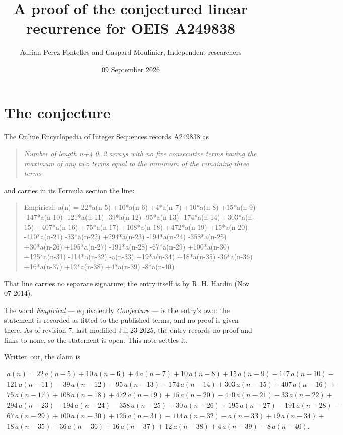 \documentclass[11pt]{article}
\title{A proof of the conjectured linear recurrence for OEIS A249838}
\author{Adrian Perez Fontelles and Gaspard Moulinier, Independent researchers}
\date{09 September 2026}
\theoremstyle{definition}
\begin{document}
\maketitle
\section{The conjecture}

The Online Encyclopedia of Integer Sequences records \href{https://oeis.org/A249838}{A249838} as

\begin{quote}\itshape Number of length n+4 0..2 arrays with no five consecutive terms having the maximum of any two terms equal to the minimum of the remaining three terms\end{quote}

and carries in its Formula section the line:

\begin{quote}\ttfamily Empirical: a(n) = 22*a(n-5) +10*a(n-6) +4*a(n-7) +10*a(n-8) +15*a(n-9) -147*a(n-10) -121*a(n-11) -39*a(n-12) -95*a(n-13) -174*a(n-14) +303*a(n-15) +407*a(n-16) +75*a(n-17) +108*a(n-18) +472*a(n-19) +15*a(n-20) -410*a(n-21) -33*a(n-22) +294*a(n-23) -194*a(n-24) -358*a(n-25) +30*a(n-26) +195*a(n-27) -191*a(n-28) -67*a(n-29) +100*a(n-30) +125*a(n-31) -114*a(n-32) -a(n-33) +19*a(n-34) +18*a(n-35) -36*a(n-36) +16*a(n-37) +12*a(n-38) +4*a(n-39) -8*a(n-40)\end{quote}

That line carries no separate signature; the entry itself is by R. H. Hardin (Nov 07 2014).

The word {\itshape Empirical} --- equivalently {\itshape Conjecture} --- is the entry's own: the statement is recorded as fitted to the published terms, and no proof is given there. As of revision 7, last modified Jul 23 2025, the entry records no proof and links to none, so the statement is open. This note settles it.

Written out, the claim is

\begin{multline*} a(n) = 22\,a(n-5) + 10\,a(n-6) + 4\,a(n-7) + 10\,a(n-8) + 15\,a(n-9) - 147\,a(n-10) - \\ 121\,a(n-11) - 39\,a(n-12) - 95\,a(n-13) - 174\,a(n-14) + 303\,a(n-15) + 407\,a(n-16) + \\ 75\,a(n-17) + 108\,a(n-18) + 472\,a(n-19) + 15\,a(n-20) - 410\,a(n-21) - 33\,a(n-22) + \\ 294\,a(n-23) - 194\,a(n-24) - 358\,a(n-25) + 30\,a(n-26) + 195\,a(n-27) - 191\,a(n-28) - \\ 67\,a(n-29) + 100\,a(n-30) + 125\,a(n-31) - 114\,a(n-32) - a(n-33) + 19\,a(n-34) + \\ 18\,a(n-35) - 36\,a(n-36) + 16\,a(n-37) + 12\,a(n-38) + 4\,a(n-39) - 8\,a(n-40). \end{multline*}
\end{document}
